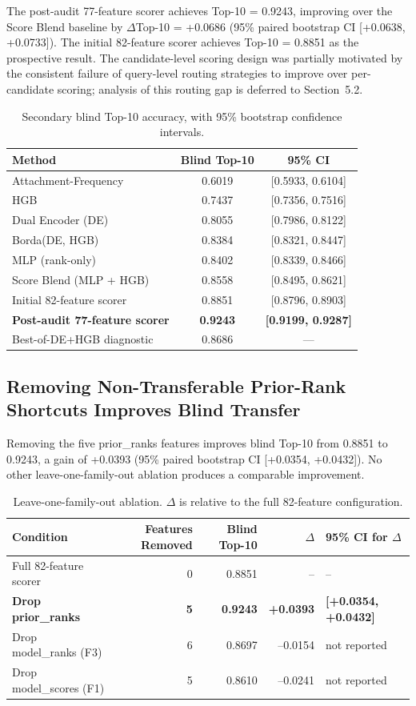 \documentclass[12pt,letterpaper]{article}
\begin{document}
The post-audit 77-feature scorer achieves Top-10 = 0.9243, improving over the Score Blend baseline by $\Delta$Top-10 = +0.0686 (95\% paired bootstrap CI [+0.0638, +0.0733]). The initial 82-feature scorer achieves Top-10 = 0.8851 as the prospective result. The candidate-level scoring design was partially motivated by the consistent failure of query-level routing strategies to improve over per-candidate scoring; analysis of this routing gap is deferred to Section~5.2.

\begin{table}[ht]
\centering
\caption{Secondary blind Top-10 accuracy, with 95\% bootstrap confidence intervals.}
\label{tab:1}
\begin{tabular}{lcc}
\toprule
Method & Blind Top-10 & 95\% CI \\
\midrule
Attachment-Frequency & 0.6019 & [0.5933, 0.6104] \\
HGB & 0.7437 & [0.7356, 0.7516] \\
Dual Encoder (DE) & 0.8055 & [0.7986, 0.8122] \\
Borda(DE, HGB) & 0.8384 & [0.8321, 0.8447] \\
MLP (rank-only) & 0.8402 & [0.8339, 0.8466] \\
Score Blend (MLP + HGB) & 0.8558 & [0.8495, 0.8621] \\
Initial 82-feature scorer & 0.8851 & [0.8796, 0.8903] \\
\textbf{Post-audit 77-feature scorer} & \textbf{0.9243} & \textbf{[0.9199, 0.9287]} \\
Best-of-DE+HGB diagnostic & 0.8686 & --- \\
\bottomrule
\end{tabular}
\end{table}

\subsection{Removing Non-Transferable Prior-Rank Shortcuts Improves Blind Transfer}

Removing the five prior\_ranks features improves blind Top-10 from 0.8851 to 0.9243, a gain of +0.0393 (95\% paired bootstrap CI [+0.0354, +0.0432]). No other leave-one-family-out ablation produces a comparable improvement.

\begin{table}[ht]
\centering
\caption{Leave-one-family-out ablation. $\Delta$ is relative to the full 82-feature configuration.}
\label{tab:2}
\begin{tabular}{lrrrl}
\toprule
Condition & Features Removed & Blind Top-10 & $\Delta$ & 95\% CI for $\Delta$ \\
\midrule
Full 82-feature scorer & 0 & 0.8851 & -- & -- \\
\textbf{Drop prior\_ranks} & \textbf{5} & \textbf{0.9243} & \textbf{+0.0393} & \textbf{[+0.0354, +0.0432]} \\
Drop model\_ranks (F3) & 6 & 0.8697 & --0.0154 & not reported \\
Drop model\_scores (F1) & 5 & 0.8610 & --0.0241 & not reported \\
\bottomrule
\end{tabular}
\end{table}
\end{document}
